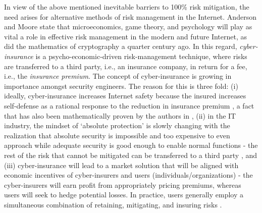 \documentclass[letterpaper,12pt, onecolumn, nodraft]{IEEEtran}
\begin{document}
In view of the above mentioned inevitable barriers to 100\% risk mitigation, the need arises for alternative methods of risk management in the Internet. Anderson and Moore \cite{amr} state that microeconomics, game theory, and psychology will play as vital a role in effective risk management in the modern and future Internet, as did the mathematics of cryptography a quarter century ago. In this regard, \emph{cyber-insurance} is a psycho-economic-driven risk-management technique, where risks are transferred to a third party, i.e., an insurance company, in return for a fee, i.e., the \emph{insurance premium}. The concept of cyber-insurance is growing in importance amongst security engineers. The reason for this is three fold: (i) ideally, cyber-insurance increases Internet safety because the insured increases self-defense as a rational response to the reduction in insurance premium \cite{kmy1}\cite{kmy2}\cite{bs}\cite{yd}, a fact that has also been mathematically proven by the authors in \cite{leb3}\cite{leb}, (ii) in the IT industry, the mindset of `absolute protection' is slowly changing with the realization that absolute security is impossible and too expensive to even approach while adequate security is good enough to enable normal functions - the rest of the risk that cannot be mitigated can be transferred to a third party \cite{kmy3}, and (iii) cyber-insurance will lead to a market solution that will be aligned with economic incentives of cyber-insurers and users (individuals/organizations) - the cyber-insurers will earn profit from appropriately pricing premiums, whereas users will seek to hedge potential losses. In practice, users generally employ a simultaneous combination of retaining, mitigating, and insuring risks \cite{bs2}.
\end{document}
